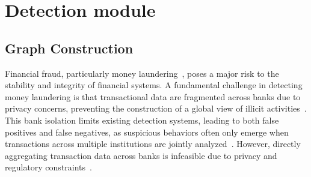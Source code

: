 \documentclass[11pt,english]{article}
\newtheorem{lemma}{Lemma}
\newtheorem{definition}{Definition}
\begin{document}






\section{Detection module}
\label{sec:Method}

\subsection{Graph Construction}
Financial fraud, particularly money laundering~\parencite{chen2018machine}, poses a major risk to the stability and integrity of financial systems. A fundamental challenge in detecting money laundering is that transactional data are fragmented across banks due to privacy concerns, preventing the construction of a global view of illicit activities~\parencite{le2018preventing, van2024privacy}. This bank isolation limits existing detection systems, leading to both false positives and false negatives, as suspicious behaviors often only emerge when transactions across multiple institutions are jointly analyzed~\parencite{wang2024temporal, amoako2025exploring}. However, directly aggregating transaction data across banks is infeasible due to privacy and regulatory constraints~\parencite{thommandru2023exploring}. 
\end{document}
